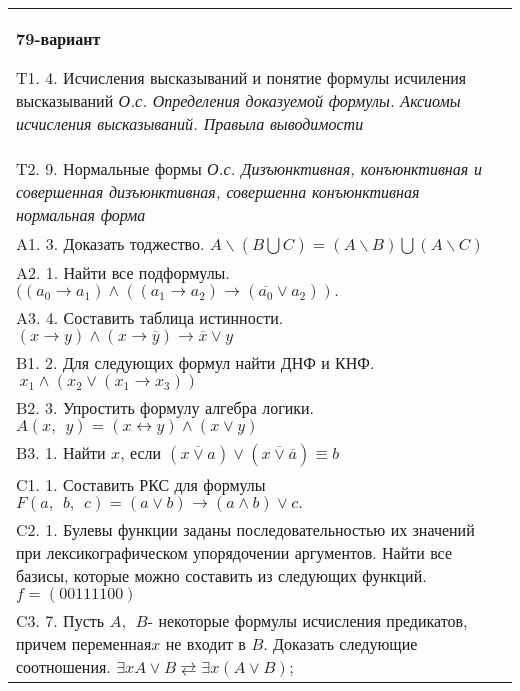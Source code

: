 \documentclass{article}
\begin{document}
\begin{tabular}{m{17cm}}
\textbf{79-вариант}
\newline

T1. 4. Исчисления высказываний и понятие формулы исчиления высказываний \emph{О.с. Определения доказуемой формулы. Аксиомы исчисления высказываний. Правыла выводимости} \\
T2. 9. Нормальные формы \emph{О.с. Дизъюнктивная, конъюнктивная и совершенная дизъюнктивная, совершенна конъюнктивная нормальная форма} \\
A1. 3. Доказать тоджество. \(A\backslash(B\bigcup C) = (A\backslash B)\bigcup(A\backslash C)\) \\
A2. 1. Найти все подформулы. \(((a_{0} \rightarrow a_{1}) \land ((a_{1} \rightarrow a_{2}) \rightarrow (\overline{a_{0}} \vee a_{2})).\) \\
A3. 4. Составить таблица истинности. \((x \rightarrow y) \land (x \rightarrow \overline{y}) \rightarrow \overline{x} \vee y\) \\
B1. 2. Для следующих формул найти ДНФ и КНФ. \(\ x_{1} \land (x_{2} \vee (x_{1} \rightarrow x_{3}))\) \\
B2. 3. Упростить формулу алгебра логики. \(A(x,\ \ y) = (x \leftrightarrow y) \land (x \vee y)\) \\
B3. 1. Найти \(x\), если \(\left( \overline{x \vee a} \right) \vee \left( \overline{x \vee \overline{a}} \right) \equiv b\) \\
C1. 1. Составить РКС для формулы \(F(a,\ \ b,\ \ c) = (a \vee b) \rightarrow (a \land b) \vee c.\) \\
C2. 1. Булевы функции заданы последовательностью их значений при лексикографическом упорядочении аргументов. Найти все базисы, которые можно составить из следующих функций.\(f = (00111100)\) \\
C3. 7. Пусть \(A,\ \ B\)- некоторые формулы исчисления предикатов, причем переменная\(x\) не входит в \(B\). Доказать следующие соотношения. \(\exists xA \vee B \rightleftarrows \exists x(A \vee B)\); \\

\end{tabular}
\vspace{1cm}
\end{document}
